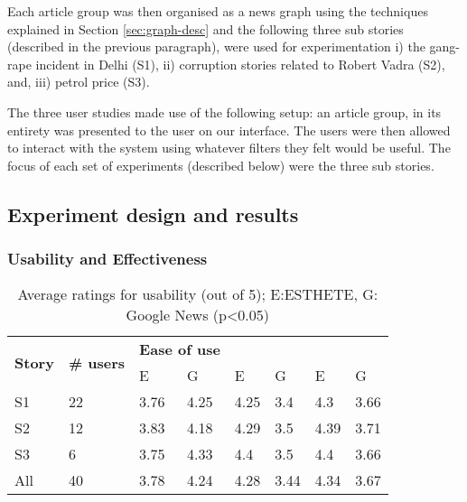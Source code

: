 Each article group was then organised as a news graph using the techniques explained in Section \ref{sec:graph-desc}  %
and the following three sub stories (described in the previous paragraph), were used for experimentation i) the gang-rape incident in Delhi (S1), ii) corruption stories related to Robert Vadra (S2), and, iii) petrol price (S3).

The three user studies made use of the following setup: an article group, in its entirety was presented to the user on our interface. The users were then allowed to interact with the system using whatever filters they felt would be useful. The focus of each set of experiments (described below) were the three sub stories.


\subsection{Experiment design and results}

\subsubsection{Usability and Effectiveness}
\label{subsec:usability}
\begin{table}
\begin{center}
\small
\begin{tabular}{|p{.69cm}|p{.65cm}|p{.70cm}|p{.70cm}|p{.70cm}|p{.70cm}|p{.70cm}|p{.70cm}|}
\hline
\multirow{2}{*}{{\bf Story}} & \multirow{2}{*}{\parbox{.55cm}{{\bf \# users}}} & \multicolumn{2}{p{1.85cm}|}{{\bf Ease of use}} & \multicolumn{2}{p{1.95cm}|}{\centering{\bf New Information}} & \multicolumn{2}{p{1.55cm}|}{\centering{\bf Big Picture}}\\ 
\cline{3-8} & & E & G & E & G & E & G \\
\hline
S1 & 22 & 3.76 & 4.25 & 4.25 & 3.4 & 4.3 & 3.66\\
S2 & 12 & 3.83 & 4.18 & 4.29 & 3.5 & 4.39 & 3.71 \\
S3 & 6 & 3.75 & 4.33 & 4.4 & 3.5 & 4.4 & 3.66\\
\hline
\hline
All & 40 & 3.78 & 4.24 & 4.28 & 3.44 & 4.34 & 3.67\\
\hline
\end{tabular}
\end{center}
\caption{Average ratings for usability (out of 5); E:ESTHETE, G: Google News (p<0.05)}
\label{tab:ease}
\end{table}

